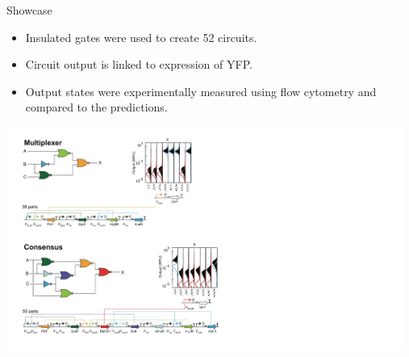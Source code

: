 \documentclass[10pt]{beamer}
\begin{document}
\begin{frame}{Showcase}

    \begin{minipage}{.4\textwidth}
        \centering
        \begin{itemize}
            \item Insulated gates were used to create 52 circuits. 
            \item Circuit output is linked to expression of YFP.
            \item Output states were experimentally measured using flow cytometry and compared to the predictions. 
        \end{itemize}
    \end{minipage}%
    \begin{minipage}{.6\textwidth}
        \centering
        \includegraphics[width=13cm]{examples.jpg}
    \end{minipage}

\end{frame}
\end{document}
